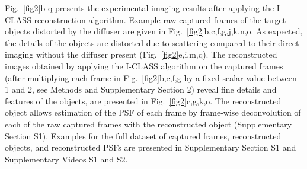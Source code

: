 \documentclass[pdflatex,sn-mathphys-num]{sn-jnl}%
\theoremstyle{thmstyleone}%
\theoremstyle{thmstyletwo}%
\theoremstyle{thmstylethree}%
\begin{document}
Fig.~\ref{fig2}b-q presents the experimental imaging results after applying the I-CLASS reconstruction algorithm. 
Example raw captured frames of the target objects distorted by the diffuser are given in Fig.~\ref{fig2}b,c,f,g,j,k,n,o. As expected, the details of the objects are distorted due to scattering compared to their direct imaging without the diffuser present  (Fig.~\ref{fig2}e,i,m,q). The reconstructed images obtained by applying the I-CLASS algorithm \cite{weinberg2023noninvasive} on the captured frames (after multiplying each frame in Fig.~\ref{fig2}b,c,f,g by a fixed scalar value between 1 and 2, see Methods and Supplementary Section 2) reveal fine details and features of the objects, are presented in Fig.~\ref{fig2}c,g,k,o. %
The reconstructed object allows estimation of the PSF of each frame by frame-wise deconvolution of each of the raw captured frames with the reconstructed object (Supplementary Section S1). Examples for the full dataset of captured frames, reconstructed objects, and reconstructed PSFs %
are presented in Supplementary Section S1 and Supplementary Videos S1 and S2.

\end{document}
